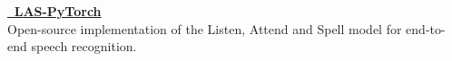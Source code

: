 {\textbf{\href{https://github.com/jiwidi/las-pytorch}{\faGithub \, LAS-PyTorch }}} \\ 
Open-source implementation of the Listen, Attend and Spell model for end-to-end speech recognition.









